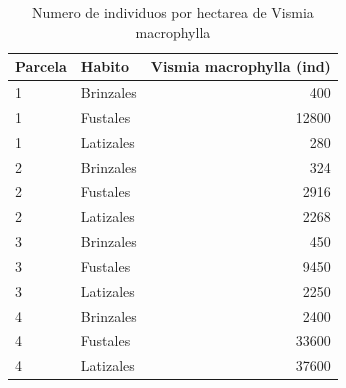 \documentclass[letterpaper,9pt,twocolumn,twoside,]{pinp}
\begin{document}
\begin{table}

\caption{\label{tab:unnamed-chunk-11}Numero de individuos por hectarea de Vismia macrophylla}
\centering
\begin{tabular}[t]{l|l|r}
\hline
Parcela & Habito & Vismia macrophylla (ind)\\
\hline
1 & Brinzales & 400\\
\hline
1 & Fustales & 12800\\
\hline
1 & Latizales & 280\\
\hline
2 & Brinzales & 324\\
\hline
2 & Fustales & 2916\\
\hline
2 & Latizales & 2268\\
\hline
3 & Brinzales & 450\\
\hline
3 & Fustales & 9450\\
\hline
3 & Latizales & 2250\\
\hline
4 & Brinzales & 2400\\
\hline
4 & Fustales & 33600\\
\hline
4 & Latizales & 37600\\
\hline
\end{tabular}
\end{table}





\end{document}
